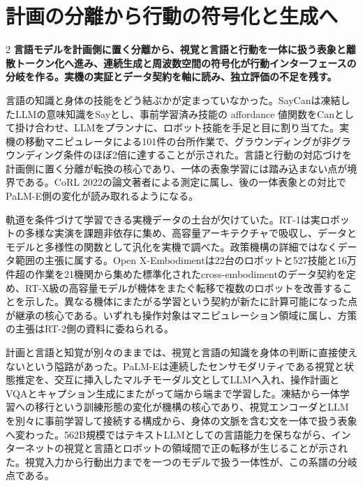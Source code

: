 \documentclass[lualatex,a4paper,10pt]{jlreq}
\begin{document}
\section{計画の分離から行動の符号化と生成へ}
\label{sec:p13}
\begin{multicols}{2}
\raggedcolumns
\noindent\textbf{言語モデルを計画側に置く分離から、視覚と言語と行動を一体に扱う表象と離散トークン化へ進み、連続生成と周波数空間の符号化が行動インターフェースの分岐を作る。実機の実証とデータ契約を軸に読み、独立評価の不足を残す。}\autocite{vmd095,vmd097}\par\medskip
\noindent 言語の知識と身体の技能をどう結ぶかが定まっていなかった。SayCanは凍結したLLMの意味知識をSayとし、事前学習済み技能の affordance 値関数をCanとして掛け合わせ、LLMをプランナに、ロボット技能を手足と目に割り当てた。実機の移動マニピュレータによる101件の台所作業で、グラウンディングが非グラウンディング条件のほぼ2倍に達することが示された。言語と行動の対応づけを計画側に置く分離が転換の核心であり、一体の表象学習には踏み込まない点が境界である。CoRL 2022の論文著者による測定に属し、後の一体表象との対比でPaLM-E側の変化が読み取れるようになる。\autocite{vmd093}\par\medskip
\noindent 軌道を条件づけて学習できる実機データの土台が欠けていた。RT-1は実ロボットの多様な実演を課題非依存に集め、高容量アーキテクチャで吸収し、データとモデルと多様性の関数として汎化を実機で調べた。政策機構の詳細ではなくデータ範囲の主張に属する。Open X-Embodimentは22台のロボットと527技能と16万件超の作業を21機関から集めた標準化されたcross-embodimentのデータ契約を定め、RT-X級の高容量モデルが機体をまたぐ転移で複数のロボットを改善することを示した。異なる機体にまたがる学習という契約が新たに計算可能になった点が継承の核心である。いずれも操作対象はマニピュレーション領域に属し、方策の主張はRT-2側の資料に委ねられる。\autocite{vmd094,vmd096}\par\medskip
\noindent 計画と言語と知覚が別々のままでは、視覚と言語の知識を身体の判断に直接使えないという隘路があった。PaLM-Eは連続したセンサモダリティである視覚と状態推定を、交互に挿入したマルチモーダル文としてLLMへ入れ、操作計画とVQAとキャプション生成にまたがって端から端まで学習した。凍結から一体学習への移行という訓練形態の変化が機構の核心であり、視覚エンコーダとLLMを別々に事前学習して接続する構成から、身体の文脈を含む文を一体で扱う表象へ変わった。562B規模ではテキストLLMとしての言語能力を保ちながら、インターネットの視覚と言語とロボットの領域間で正の転移が生じることが示された。視覚入力から行動出力までを一つのモデルで扱う一体性が、この系譜の分岐点である。\autocite{vmd095}\par\medskip

\end{multicols}
\end{document}
